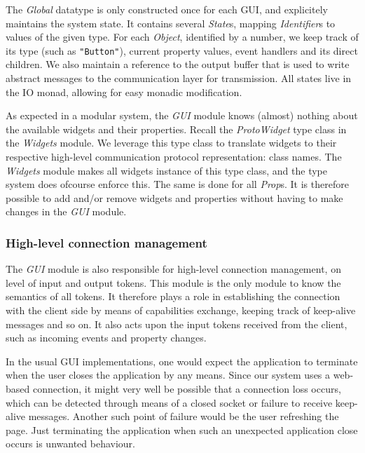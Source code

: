 \documentclass[11pt,a4paper]{article}
\begin{document}
The \textit{Global} datatype is only constructed once for each GUI, and explicitely maintains the system state.
It contains several \textit{State}s, mapping \textit{Identifier}s to values of the given type.
For each \textit{Object}, identified by a number, we keep track of its type (such as \texttt{"Button"}), current property values, event handlers and its direct children.
We also maintain a reference to the output buffer that is used to write abstract messages to the communication layer for transmission.
All states live in the IO monad, allowing for easy monadic modification.

As expected in a modular system, the \textit{GUI} module knows (almost) nothing about the available widgets and their properties.
Recall the \textit{ProtoWidget} type class in the \textit{Widgets} module.
We leverage this type class to translate widgets to their respective high-level communication protocol representation: class names.
The \textit{Widgets} module makes all widgets instance of this type class, and the type system does ofcourse enforce this.
The same is done for all \textit{Prop}s.
It is therefore possible to add and/or remove widgets and properties without having to make changes in the \textit{GUI} module.

\subsubsection{High-level connection management}
The \textit{GUI} module is also responsible for high-level connection management, on level of input and output tokens.
This module is the only module to know the semantics of all tokens.
It therefore plays a role in establishing the connection with the client side by means of capabilities exchange, keeping track of keep-alive messages and so on.
It also acts upon the input tokens received from the client, such as incoming events and property changes.

In the usual GUI implementations, one would expect the application to terminate when the user closes the application by any means.
Since our system uses a web-based connection, it might very well be possible that a connection loss occurs, which can be detected through means of a closed socket or failure to receive keep-alive messages.
Another such point of failure would be the user refreshing the page.
Just terminating the application when such an unexpected application close occurs is unwanted behaviour.
\end{document}
